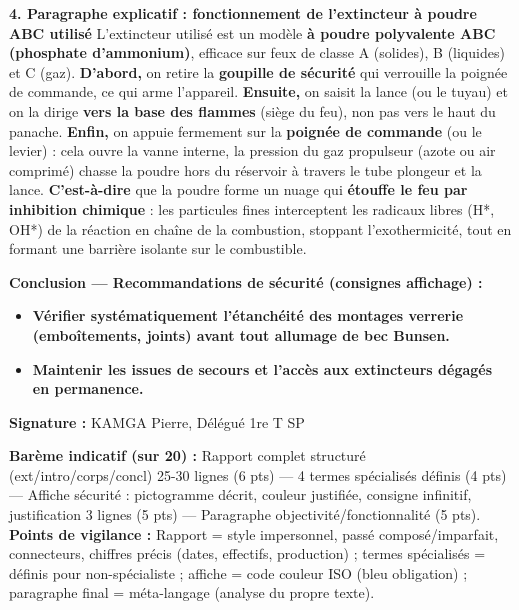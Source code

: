 \documentclass[11pt]{article}
\begin{document}
\begin{exemplebox}
\textbf{4. Paragraphe explicatif : fonctionnement de l'extincteur à poudre ABC utilisé}
L'extincteur utilisé est un modèle \textbf{à poudre polyvalente ABC (phosphate d'ammonium)}, efficace sur feux de classe A (solides), B (liquides) et C (gaz). \textbf{D'abord,} on retire la \textbf{goupille de sécurité} qui verrouille la poignée de commande, ce qui arme l'appareil. \textbf{Ensuite,} on saisit la lance (ou le tuyau) et on la dirige \textbf{vers la base des flammes} (siège du feu), non pas vers le haut du panache. \textbf{Enfin,} on appuie fermement sur la \textbf{poignée de commande} (ou le levier) : cela ouvre la vanne interne, la pression du gaz propulseur (azote ou air comprimé) chasse la poudre hors du réservoir à travers le tube plongeur et la lance. \textbf{C'est-à-dire} que la poudre forme un nuage qui \textbf{étouffe le feu par inhibition chimique} : les particules fines interceptent les radicaux libres (H*, OH*) de la réaction en chaîne de la combustion, stoppant l'exothermicité, tout en formant une barrière isolante sur le combustible.

\textbf{Conclusion — Recommandations de sécurité (consignes affichage) :}
\begin{itemize}
\item \textbf{Vérifier systématiquement l'étanchéité des montages verrerie (emboîtements, joints) avant tout allumage de bec Bunsen.}
\item \textbf{Maintenir les issues de secours et l'accès aux extincteurs dégagés en permanence.}
\end{itemize}

\textbf{Signature :} KAMGA Pierre, Délégué 1re T SP
\end{exemplebox}

\begin{corrige}
\textbf{Barème indicatif (sur 20) :} Rapport complet structuré (ext/intro/corps/concl) 25-30 lignes (6 pts) — 4 termes spécialisés définis (4 pts) — Affiche sécurité : pictogramme décrit, couleur justifiée, consigne infinitif, justification 3 lignes (5 pts) — Paragraphe objectivité/fonctionnalité (5 pts). \textbf{Points de vigilance :} Rapport = style impersonnel, passé composé/imparfait, connecteurs, chiffres précis (dates, effectifs, production) ; termes spécialisés = définis pour non-spécialiste ; affiche = code couleur ISO (bleu obligation) ; paragraphe final = méta-langage (analyse du propre texte).
\end{corrige}
\end{document}
